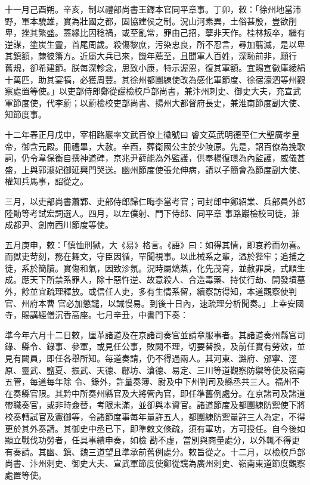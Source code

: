 \begin{pinyinscope}
 十一月己酉朔。辛亥，制以禮部尚書王鐸本官同平章事。丁卯，敕：「徐州地當沛野，軍本驍雄，實為壯國之都，固協建侯之制。況山河素異，土俗甚殷，豈欲削卑，挫其繁盛。蓋緣比因稔禍，或至亂常，罪由己招，孽非天作。桂林叛卒，繼有逆謀，塗炭生靈，首尾周歲。殺傷黎庶，污染忠良，所不忍言，尋加翦滅，是以卑其鎮額，隸彼籓方。近屬大兵已來，饑年薦至，且聞軍人百姓，深恥前非，願行
 舊規，卻希建節。朕每深軫念，思致小康，特示渥恩，復其軍額。宜賜宣徽庫綾絹十萬匹，助其宴犒，必獲周豐。其徐州都團練使改為感化軍節度、徐宿濠泗等州觀察處置等使。」以吏部侍郎鄭從讜檢校戶部尚書，兼汴州刺史、御史大夫，充宣武軍節度使，代李蔚；以蔚檢校吏部尚書、揚州大都督府長史，兼淮南節度副大使、知節度事。



 十二年春正月戊申，宰相路巖率文武百僚上徽號曰
 睿文英武明德至仁大聖廣孝皇帝，御含元殿。冊禮畢，大赦。辛酉，葬衛國公主於少陵原。先是，詔百僚為挽歌詞，仍令韋保衡自撰神道碑，京兆尹薛能為外監護，供奉楊復璟為內監護，威儀甚盛，上與郭淑妃御延興門哭送。幽州節度使張允伸病，請以子簡會為節度副大使、權知兵馬事，詔從之。



 三月，以吏部尚書蕭鄴、吏部侍郎歸仁晦李當考官；司封郎中鄭紹業、兵部員外郎陸勛等考試宏詞選人。四月，以左僕射、門下侍郎、同平章
 事路巖檢校司徒，兼成都尹、劍南西川節度等使。



 五月庚申，敕：「慎恤刑獄，大《易》格言。《語》曰：如得其情，即哀矜而勿喜。而獄吏苛刻，務在舞文，守臣因循，罕聞視事。以此械系之輩，溢於狴牢；追捕之徒，系於簡牘。實傷和氣，因致沴氛。況時屬熇蒸，化先茂育，並赦罪戾，式順生成。應天下所禁系罪人，除十惡忤逆、故意殺人、合造毒藥、持仗行劫、開發墳墓外，餘並宜疏理釋放。或信任人吏，多有生情系留，續察訪得知，本道觀察使判官、州府本曹
 官必加懲譴，以誡慢易。到後十日內，速疏理分析聞奏。」上幸安國寺，賜講經僧沉香高座。七月辛丑，中書門下奏：



 準今年六月十二日敕，厘革諸道及在京諸司奏官並請章服事者。其諸道奏州縣官司錄、縣令、錄事、參軍，或見任公事，敗闕不理，切要替換，及前任實有勞效，並見有闕員，即任各舉所知。每道奏請，仍不得過兩人。其河東、潞府、邠寧、涇原、靈武、鹽夏、振武、天德、鄜坊、滄德、易定、三川等道觀察防禦等使及嶺南五管，每道每年除
 令、錄外，許量奏簿、尉及中下州判司及縣丞共三人。福州不在奏縣官限。其黔中所奏州縣官及大將管內官，即任準舊例處分。在京諸司及諸道帶職奏官，或非時僉替，考限未滿，並卻與本資官。諸道節度及都團練防禦使下將校奏轉試官及憲御等，令諸節度事每年量許五人，都團練防禦量許三人為定，不得更於其外奏請。其御史中丞已下，即準敕文條疏，須有軍功，方可授任。自今後如顯立戰伐功勞者，任具事績申奏，如檢
 勘不虛，當別與商量處分，以外輒不得更有奏請。其幽、鎮、魏三道望且準承前舊例處分。敕旨從之。十二月，以檢校戶部尚書、汴州刺史、御史大夫、宣武軍節度使鄭從讜為廣州刺史、嶺南東道節度觀察處置等使。




\end{pinyinscope}
